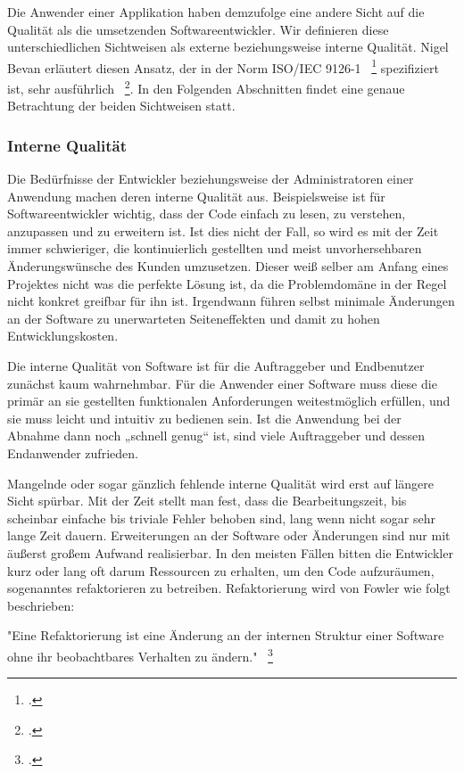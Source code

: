 Die Anwender einer Applikation haben demzufolge eine andere Sicht auf die Qualität als die umsetzenden Softwareentwickler. Wir definieren diese unterschiedlichen Sichtweisen als externe beziehungsweise interne Qualität. Nigel Bevan erläutert diesen Ansatz, der in der Norm ISO/IEC 9126-1 ~\footcite[]{ISOIEC91261} spezifiziert ist, sehr ausführlich ~\footcite[]{Bevan.1999}. In den Folgenden Abschnitten findet eine genaue Betrachtung der beiden Sichtweisen statt.

\subsubsection{Interne Qualität}
Die Bedürfnisse der Entwickler beziehungsweise der Administratoren einer Anwendung machen deren interne Qualität aus. Beispielsweise ist für Softwareentwickler wichtig, dass der Code einfach zu lesen, zu verstehen, anzupassen und zu erweitern ist. Ist dies nicht der Fall, so wird es mit der Zeit immer schwieriger, die kontinuierlich gestellten und meist unvorhersehbaren Änderungswünsche des Kunden umzusetzen. Dieser weiß selber am Anfang eines Projektes nicht was die perfekte Lösung ist, da die Problemdomäne in der Regel nicht konkret greifbar für ihn ist. Irgendwann führen selbst minimale Änderungen an der Software zu unerwarteten Seiteneffekten und damit zu hohen Entwicklungskosten.

Die interne Qualität von Software ist für die Auftraggeber und Endbenutzer zunächst kaum wahrnehmbar. Für die Anwender einer Software muss diese die primär an sie gestellten funktionalen Anforderungen weitestmöglich erfüllen, und sie muss leicht und intuitiv zu bedienen sein. Ist die Anwendung bei der Abnahme dann noch „schnell genug“ ist, sind viele Auftraggeber und dessen Endanwender zufrieden.

Mangelnde oder sogar gänzlich fehlende interne Qualität wird erst auf längere Sicht spürbar. Mit der Zeit stellt man fest, dass die Bearbeitungszeit, bis scheinbar einfache bis triviale Fehler behoben sind, lang wenn nicht sogar sehr lange Zeit dauern. Erweiterungen an der Software oder Änderungen sind nur mit äußerst großem Aufwand realisierbar. In den meisten Fällen bitten die Entwickler kurz oder lang oft darum Ressourcen zu erhalten, um den Code aufzuräumen, sogenanntes refaktorieren zu betreiben. Refaktorierung wird von Fowler wie folgt beschrieben: 

"Eine Refaktorierung ist eine Änderung an der internen Struktur einer Software ohne ihr beobachtbares Verhalten zu ändern." ~\footcite[Seite xviii]{Fowler.2000}

